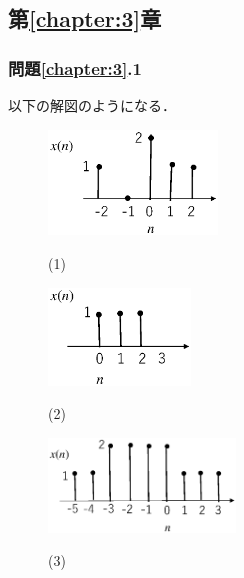 \subsection*{第\ref{chapter:3}章}

\subsubsection*{問題\ref{chapter:3}.1}

以下の解図のようになる．

\begin{figure}[H]
\begin{center}

\begin{minipage}[b]{.32\textwidth}
\begin{center}
\includegraphics[height=2.8cm]{fig/zu-3e-1a.eps}

(1)
\end{center}
\end{minipage}
\begin{minipage}[b]{.25\textwidth}
\begin{center}
\includegraphics[height=2.6cm]{fig/zu-3e-1b.eps}

(2)
\end{center}
\end{minipage}
\begin{minipage}[b]{.35\textwidth}
\begin{center}
\includegraphics[height=2.5cm]{fig/zu-3e-1c.eps}

(3)
\end{center}
\end{minipage}

\end{center}
\end{figure}



